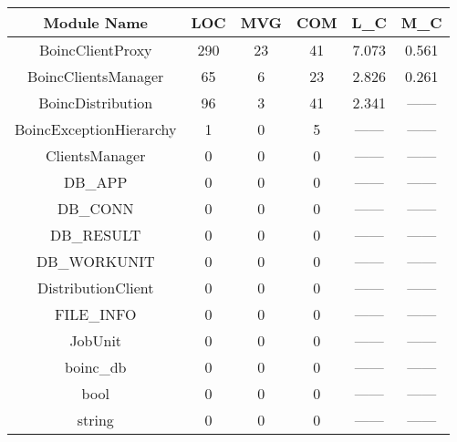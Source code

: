 \begin{tabular}{|c|c|c|c|c|c|}
\hline 
Module Name &LOC &MVG &COM &L\_C &M\_C \\
 \hline 
 BoincClientProxy & 290 & 23 & 41 & 7.073 & 0.561\\
 \hline 
 BoincClientsManager & 65 & 6 & 23 & 2.826 & 0.261  \\
 \hline 
 BoincDistribution & 96 & 3 & 41 & 2.341 & ------ \\
 \hline 
 BoincExceptionHierarchy & 1 & 0 & 5 & ------ & ------\\
 \hline 
 ClientsManager & 0 & 0 & 0 &------ &------ \\
 \hline 
 DB\_APP & 0 & 0 & 0 &------ &------ \\
 \hline 
 DB\_CONN & 0 & 0 & 0 &------ &------ \\
 \hline 
 DB\_RESULT & 0 & 0 & 0 &------ &------ \\
 \hline 
 DB\_WORKUNIT & 0 & 0 & 0 &------ &------ \\
 \hline 
 DistributionClient & 0 & 0 & 0 &------ &------ \\
 \hline 
 FILE\_INFO & 0 & 0 & 0 &------ &------ \\
 \hline 
 JobUnit & 0 & 0 & 0 &------ &------ \\
 \hline 
 boinc\_db & 0 & 0 & 0 &------ &------ \\
 \hline 
 bool & 0 & 0 & 0 &------ &------ \\
 \hline  
 string & 0 & 0 & 0 &------ &------ \\
 \hline 


\end{tabular}

